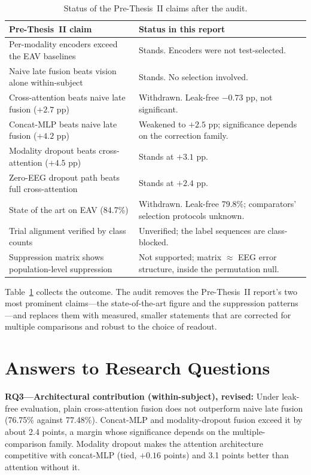 \begin{table}[htbp]
\centering
\small
\caption{Status of the Pre-Thesis~II claims after the audit.}
\label{tab:audit_summary}
\begin{tabular}{p{6.2cm} p{7.4cm}}
\hline
\textbf{Pre-Thesis~II claim} & \textbf{Status in this report} \\
\hline
Per-modality encoders exceed the EAV baselines & Stands. Encoders were not test-selected. \\
Naive late fusion beats vision alone within-subject & Stands. No selection involved. \\
Cross-attention beats naive late fusion ($+2.7$ pp) & Withdrawn. Leak-free $-0.73$ pp, not significant. \\
Concat-MLP beats naive late fusion ($+4.2$ pp) & Weakened to $+2.5$ pp; significance depends on the correction family. \\
Modality dropout beats cross-attention ($+4.5$ pp) & Stands at $+3.1$ pp. \\
Zero-EEG dropout path beats full cross-attention & Stands at $+2.4$ pp. \\
State of the art on EAV (84.7\%) & Withdrawn. Leak-free 79.8\%; comparators' selection protocols unknown. \\
Trial alignment verified by class counts & Unverified; the label sequences are class-blocked. \\
Suppression matrix shows population-level suppression & Not supported; matrix $\approx$ EEG error structure, inside the permutation null. \\
\hline
\end{tabular}
\end{table}

Table~\ref{tab:audit_summary} collects the outcome. The audit removes the Pre-Thesis~II
report's two most prominent claims---the state-of-the-art figure and the suppression
patterns---and replaces them with measured, smaller statements that are corrected for
multiple comparisons and robust to the choice of readout.

\section{Answers to Research Questions}
\label{sec:audit_rq}

\textbf{RQ3---Architectural contribution (within-subject), revised:} Under leak-free
evaluation, plain cross-attention fusion does not outperform naive late fusion
(76.75\% against 77.48\%). Concat-MLP and modality-dropout fusion exceed it by about
2.4 points, a margin whose significance depends on the multiple-comparison family.
Modality dropout makes the attention architecture competitive with concat-MLP (tied,
$+0.16$ points) and 3.1 points better than attention without it.

